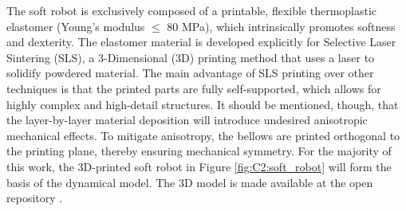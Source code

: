 \begin{rmk} The soft robot is exclusively composed of a printable, flexible thermoplastic elastomer (Young's modulus $\le$ 80 \si{\mega \pascal}), which intrinsically promotes softness and dexterity. The elastomer material is developed explicitly for Selective Laser Sintering (SLS), a 3-Dimensional (3D) printing method that uses a laser to solidify powdered material. The main advantage of SLS printing over other techniques is that the printed parts are fully self-supported, which allows for highly complex and high-detail structures. It should be mentioned, though, that the layer-by-layer material deposition will introduce undesired anisotropic mechanical effects. To mitigate anisotropy, the bellows are printed orthogonal to the printing plane, thereby ensuring mechanical symmetry. For the majority of this work, the 3D-printed soft robot in Figure \ref{fig:C2:soft_robot} will form the basis of the dynamical model. The 3D model is made available at the open repository \cite{Caasenbrood2020}.
\end{rmk}
